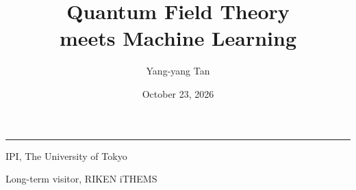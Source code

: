 \documentclass[11pt,t]{beamer}
\title{Quantum Field Theory\\ meets Machine Learning}
\subtitle{}
\date{October 23, 2026}
\author{Yang-yang Tan}
\begin{document}
\begin{frame}
  \inserttitlegraphic\par
  \vspace*{0.5cm}
  {\LARGE\bfseries \inserttitle\par}
  \vspace{0.4em}
  {\color{orange}\rule{\textwidth}{0.4pt}\par}
  \vspace{1.4em}
  {\normalsize\bfseries \insertauthor\par}
  \vspace{0.6em}
  {\small IPI, The University of Tokyo\par}
  \vspace{0.2em}
  {\small Long-term visitor, RIKEN iTHEMS\par}
  \vspace{0.6em}
  {\normalsize \insertdate\par}
\end{frame}
\end{document}

